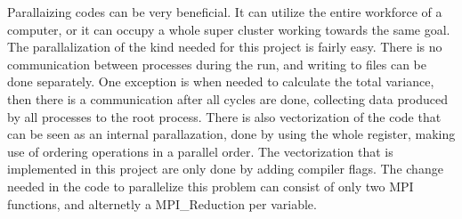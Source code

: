 %
Parallaizing codes can be very beneficial. It can utilize the entire workforce
of a computer, or it can occupy a whole super cluster working towards the same goal.
The parallalization of the kind needed for this project is fairly easy. 
There is no communication between processes during the run, and writing to files can be done separately. 
One exception is when needed to calculate the total variance, then there is a communication after
all cycles are done, collecting data produced by all processes to the root process.
There is also vectorization of the code that can be seen as an internal parallazation, done by using the whole register, making use of ordering operations
in a parallel order. The vectorization that is implemented in this project are 
only done by adding compiler flags.
The change needed in the code to parallelize this problem can consist of only two MPI functions, and
alternetly a MPI_Reduction per variable.

%
